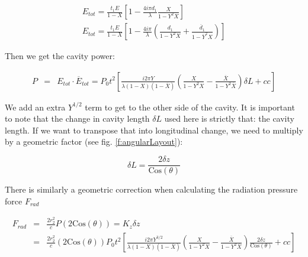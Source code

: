 \begin{eqnarray}
\label{e:Etot}
E_{tot} = \frac{t_1 E}{1-X}\left[ 1- \frac{4i\pi d_1}{\lambda}\frac{X}{1-Y^2X}\right]\nonumber\\
E_{tot} = \frac{t_1 E}{1-X}\left[ 1- \frac{4i\pi}{\lambda}\left(\frac{ d_1}{1-Y^2X}+\frac{ \overline{d}_1}{1-\overline{Y}^2X}\right)\right]
\end{eqnarray}

Then we get the cavity power:

\begin{eqnarray}
\label{e:P}
P&=&E_{tot}\cdot \overline{E}_{tot}=P_0 t^2\left[ \frac{i 2\pi Y}{\lambda(1-X)(1-\overline{X})}\left(\frac{X}{1-Y^2X}-\frac{\overline{X}}{1-Y^2\overline{X}}\right)\delta L+cc\right]  
\end{eqnarray}

We add an extra $Y^{1/2}$ term to get to the other side of the cavity.
It is important to note that the change in cavity length $\delta L$ used here is strictly that: the cavity length. If we want to transpose that into longitudinal change, we need to multiply by a geometric factor (see fig. \ref{f:angularLayout}):

\begin{equation}
\delta L = \frac{2 \delta z}{\mbox{Cos}(\theta)}
\label{e:deltaL}
\end{equation}

There is similarly a geometric correction when calculating the radiation pressure force $F_{rad}$

\begin{eqnarray}
F_{rad} &=& \frac{2r_2^2}{c} P (2 \mbox{Cos}(\theta)) = K_z \delta z\\
&=& \frac{2r_2^2}{c} (2 \mbox{Cos}(\theta)) P_0 t^2\left[ \frac{i 2\pi Y^{3/2}}{\lambda(1-X)(1-\overline{X})}\left(\frac{X}{1-Y^2X}-\frac{\overline{X}}{1-Y^2\overline{X}}\right)\frac{2 \delta z}{\mbox{Cos}(\theta)}+cc\right] 
\label{e:Frad}
\end{eqnarray}

